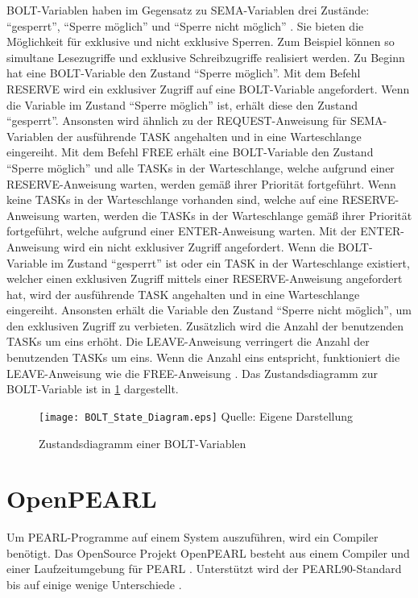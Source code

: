 \textrm{BOLT}-Variablen haben im Gegensatz zu \textrm{SEMA}-Variablen drei
Zustände: "`gesperrt"', "`Sperre möglich"' und "`Sperre nicht möglich"'
\autocite[vgl.][125]{PEARL}. Sie bieten die Möglichkeit für exklusive und nicht
exklusive Sperren. Zum Beispiel können so simultane Lesezugriffe und exklusive
Schreibzugriffe realisiert werden. Zu Beginn hat eine
\textrm{BOLT}-Variable den Zustand "`Sperre möglich"'. Mit dem Befehl \textrm{RESERVE}
wird ein exklusiver Zugriff auf eine \textrm{BOLT}-Variable angefordert. Wenn
die Variable im Zustand "`Sperre möglich"' ist, erhält diese den Zustand
"`gesperrt"'. Ansonsten wird ähnlich zu der \textrm{REQUEST}-Anweisung für
\textrm{SEMA}-Variablen der ausführende \textrm{TASK} angehalten und in eine
Warteschlange eingereiht. Mit dem Befehl \textrm{FREE} erhält eine
\textrm{BOLT}-Variable den Zustand "`Sperre möglich"' und alle \textrm{TASKs} in
der Warteschlange, welche aufgrund einer \textrm{RESERVE}-Anweisung warten,
werden gemäß ihrer Priorität fortgeführt. Wenn keine \textrm{TASKs} in der
Warteschlange vorhanden sind, welche auf eine \textrm{RESERVE}-Anweisung warten,
werden die \textrm{TASKs} in der Warteschlange gemäß ihrer Priorität
fortgeführt, welche aufgrund einer \textrm{ENTER}-Anweisung warten. Mit der
\textrm{ENTER}-Anweisung wird ein nicht exklusiver Zugriff angefordert. Wenn die
\textrm{BOLT}-Variable im Zustand "`gesperrt"' ist oder ein \textrm{TASK} in der
Warteschlange existiert, welcher einen exklusiven Zugriff mittels einer
\textrm{RESERVE}-Anweisung angefordert hat, wird der ausführende \textrm{TASK}
angehalten und in eine Warteschlange eingereiht. Ansonsten erhält die Variable
den Zustand "`Sperre nicht möglich"', um den exklusiven Zugriff zu verbieten.
Zusätzlich wird die Anzahl der benutzenden \textrm{TASKs} um eins erhöht. Die
\textrm{LEAVE}-Anweisung verringert die Anzahl der benutzenden \textrm{TASKs} um
eins. Wenn die Anzahl eins entspricht, funktioniert die \textrm{LEAVE}-Anweisung
wie die \textrm{FREE}-Anweisung \autocite[vgl.][125-127]{PEARL}. Das
Zustandsdiagramm zur \textrm{BOLT}-Variable ist in \cref{fig:BOLT_StateDiagram}
dargestellt.
\begin{figure}[ht]
  \texttt{[image: BOLT\_State\_Diagram.eps]}
  \footnotesize\sffamily Quelle: Eigene Darstellung
  \caption{Zustandsdiagramm einer BOLT-Variablen}
  \label{fig:BOLT_StateDiagram}
\end{figure}

\section{OpenPEARL}
\label{section:OpenPEARL}
Um PEARL-Programme auf einem System auszuführen, wird ein Compiler benötigt. Das
OpenSource Projekt OpenPEARL besteht aus einem Compiler und einer
Laufzeitumgebung für PEARL \autocite{OpenPEARL_Structure}. Unterstützt wird der
PEARL90-Standard bis auf einige wenige Unterschiede
\autocite{OpenPEARL_Differences_To_PEARL90}.

